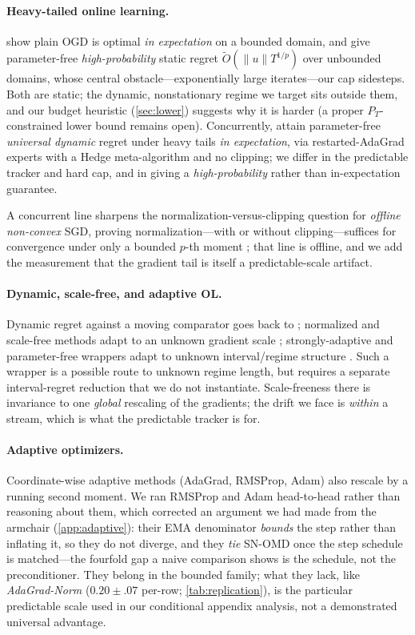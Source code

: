 \documentclass{article}
\newcommand{\norm}[1]{\lVert #1 \rVert}
\begin{document}
\paragraph{Heavy-tailed online learning.} \citet{liu2026oco} show plain OGD is optimal
\emph{in expectation} on a bounded domain, and \citet{zhangcutkosky2022} give parameter-free
\emph{high-probability} static regret $\tilde O(\norm u T^{1/p})$ over unbounded domains,
whose central obstacle---exponentially large iterates---our cap sidesteps. Both are static;
the dynamic, nonstationary regime we target sits outside them, and our budget heuristic
(\cref{sec:lower}) suggests why it is harder (a proper $P_T$-constrained lower bound remains
open). Concurrently, \citet{aggarwal2026dynamic} attain parameter-free \emph{universal
dynamic} regret under heavy tails \emph{in expectation}, via restarted-AdaGrad experts with
a Hedge meta-algorithm and no clipping; we differ in the predictable tracker and hard cap, and
in giving a \emph{high-probability} rather than in-expectation guarantee.

A concurrent line sharpens the normalization-versus-clipping question for \emph{offline
non-convex} SGD, proving normalization---with or without clipping---suffices for convergence
under only a bounded $p$-th moment
\citep{liuzhou2025nonconvex,hubler2025clipping,sun2024normalization}; that line is offline, and
we add the measurement that the gradient tail is itself a predictable-scale artifact.

\paragraph{Dynamic, scale-free, and adaptive OL.} Dynamic regret against a moving comparator
goes back to \citet{zinkevich2003}; normalized and scale-free methods adapt to an unknown
gradient scale \citep{levy2017,orabona2018}; strongly-adaptive and parameter-free wrappers adapt to unknown
interval/regime structure \citep{daniely2015,cutkosky2020}. Such a wrapper is a possible route
to unknown regime length, but requires a separate interval-regret reduction that we do not
instantiate. Scale-freeness there is invariance to one \emph{global}
rescaling of the gradients; the drift we face is \emph{within} a stream, which is what the
predictable tracker is for.

\paragraph{Adaptive optimizers.} Coordinate-wise adaptive methods (AdaGrad, RMSProp, Adam)
also rescale by a running second moment. We ran RMSProp and Adam head-to-head rather than
reasoning about them, which corrected an argument we had made from the armchair
(\cref{app:adaptive}): their EMA denominator \emph{bounds} the step rather than inflating it, so
they do not diverge, and they \emph{tie} SN-OMD once the step schedule is matched---the fourfold
gap a naive comparison shows is the schedule, not the preconditioner. They belong in the bounded
family; what they lack, like \emph{AdaGrad-Norm} ($0.20\!\pm\!.07$ per-row;
\cref{tab:replication}), is the particular predictable scale used in our conditional appendix
analysis, not a demonstrated universal advantage.
\end{document}
